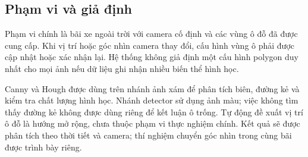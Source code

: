 \subsection{Phạm vi và giả định}
Phạm vi chính là bãi xe ngoài trời với camera cố định và các vùng ô đỗ đã được cung cấp. Khi vị trí hoặc góc nhìn camera thay đổi, cấu hình vùng ô phải được cập nhật hoặc xác nhận lại. Hệ thống không giả định một cấu hình polygon duy nhất cho mọi ảnh nếu dữ liệu ghi nhận nhiều biến thể hình học.

Canny và Hough được dùng trên nhánh ảnh xám để phân tích biên, đường kẻ và kiểm tra chất lượng hình học. Nhánh detector sử dụng ảnh màu; việc không tìm thấy đường kẻ không được dùng riêng để kết luận ô trống. Tự động đề xuất vị trí ô đỗ là hướng mở rộng, chưa thuộc phạm vi thực nghiệm chính. Kết quả sẽ được phân tích theo thời tiết và camera; thí nghiệm chuyển góc nhìn trong cùng bãi được trình bày riêng.
